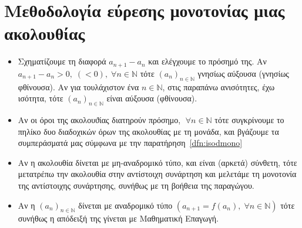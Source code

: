 \documentclass[main.tex]{subfiles}
\begin{document}
\section{Μεθοδολογία εύρεσης μονοτονίας μιας ακολουθίας}
\begin{itemize}
  \item Σχηματίζουμε τη διαφορά $ a_{n+1} - a_n $ και ελέγχουμε το 
    πρόσημό της. Αν $ a_{n+1}-a_{n}>0, \; (<0), \; \forall n \in 
    \mathbb{N} $ τότε $ (a_{n})_{n \in \mathbb{N}}$ γνησίως 
    αύξουσα (γνησίως φθίνουσα). Αν για τουλάχιστον ένα 
    $ n \in \mathbb{N} $, στις παραπάνω ανισότητες, έχω ισότητα, 
    τότε  $ (a_{n})_{n \in \mathbb{N}} $ είναι αύξουσα (φθίνουσα).
  \item Αν οι όροι της ακολουϑίας διατηρούν πρόσημο, $ \; \forall n \in
    \mathbb{N} $ τότε συγκρίνουμε το πηλίκο δυο διαδοχικών όρων της 
    ακολουθίας με τη μονάδα, και βγάζουμε τα συμπεράσματά μας 
    σύμφωνα με την παρατήρηση~\ref{dfn:isodmono}
  \item Αν η ακολουθία δίνεται με μη-αναδρομικό τύπο, και είναι 
    (αρκετά) σύνθετη, τότε μετατρέπω την ακολουθία στην αντίστοιχη 
    συνάρτηση και μελετάμε τη μονοτονία της αντίστοιχης συνάρτησης, 
    συνήθως με τη βοήθεια της παραγώγου.
  \item Αν η $ (a_{n})_{n \in \mathbb{N}} $ δίνεται με αναδρομικό 
    τύπο $ (a_{n+1}= f(a_{n}), \; \forall n \in \mathbb{N}) $ τότε 
    συνήθως η απόδειξή της γίνεται με Μαθηματική Επαγωγή.
\end{itemize}
\end{document}
